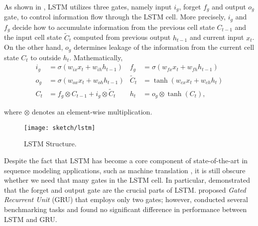 As shown in \addfigure{\ref{fig:lstm_structure}}, LSTM utilizes three gates, namely input $i_g$, forget $f_g$ and output $o_g$ gate, to control  information flow through the LSTM cell. More precisely, $i_g$ and $f_g$ decide how to accumulate information from the previous cell state $C_{t-1}$ and the input cell state $\widetilde{C}_t$ computed from previous output $h_{t-1}$ and current input $x_t$. On the other hand, $o_g$ determines leakage of the information from the current cell state $C_t$ to outside $h_t$. Mathematically, 
\begin{align*}
	i_g &= \sigma( w_{ix} x_t + w_{ih} h_{t-1} )  &  	f_g &= \sigma( w_{fx} x_t + w_{fh} h_{t-1} )\\
	o_g &= \sigma( w_{ox} x_t + w_{oh} h_{t-1} ) & \widetilde{C}_t &= \tanh(w_{cx} x_t + w_{ch} h_t) \\
	C_t &= f_g \otimes C_{t-1} + i_g  \otimes  \widetilde{C}_t & h_{t} &= o_g \otimes \tanh(C_t),
\end{align*}

where $\otimes$ denotes an element-wise multiplication.


\begin{figure}
\centering
\texttt{[image: sketch/lstm]}
\caption{LSTM Structure.} 

\label{fig:lstm_structure} 
\end{figure}

Despite the fact that  LSTM has become a core component of state-of-the-art in sequence modeling applications, such as machine translation \citep{MelisStateArtEvaluation2018}, it is still obscure whether we need that many gates in the LSTM cell. In particular, \citet{GreffLSTMsearchspace2017} demonstrated that the forget and output gate are the crucial parts of LSTM.  \citet{ChoLearningPhraseRepresentations2014a} proposed \textit{Gated Recurrent Unit} (GRU) that employs only two	 gates; however, \citet{JozefowiczEmpiricalExplorationRecurrent2015} conducted several benchmarking tasks and found no significant difference in performance between LSTM and GRU. 

